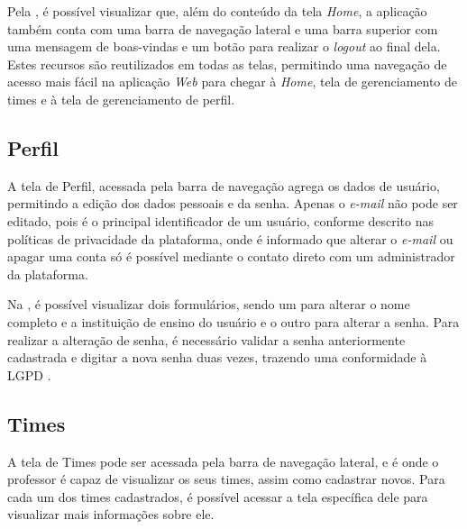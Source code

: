 


Pela , é possível visualizar que, além do conteúdo da tela \textit{Home}, a aplicação também conta com uma barra de navegação lateral e uma barra superior com uma mensagem de boas-vindas e um botão para realizar o \textit{logout} ao final dela. Estes recursos são reutilizados em todas as telas, permitindo uma navegação de acesso mais fácil na aplicação \textit{Web} para chegar à \textit{Home}, tela de gerenciamento de times e à tela de gerenciamento de perfil.

\subsection{Perfil}

A tela de Perfil, acessada pela barra de navegação agrega os dados de usuário, permitindo a edição dos dados pessoais e da senha. Apenas o \textit{e-mail} não pode ser editado, pois é o principal identificador de um usuário, conforme descrito nas políticas de privacidade da plataforma, onde é informado que alterar o \textit{e-mail} ou apagar uma conta só é possível mediante o contato direto com um administrador da plataforma.


Na , é possível visualizar dois formulários, sendo um para alterar o nome completo e a instituição de ensino do usuário e o outro para alterar a senha. Para realizar a alteração de senha, é necessário validar a senha anteriormente cadastrada e digitar a nova senha duas vezes, trazendo uma conformidade à LGPD \cite{lgpd}.

\subsection{Times}

A tela de Times pode ser acessada pela barra de navegação lateral, e é onde o professor é capaz de visualizar os seus times, assim como cadastrar novos. Para cada um dos times cadastrados, é possível acessar a tela específica dele para visualizar mais informações sobre ele.

